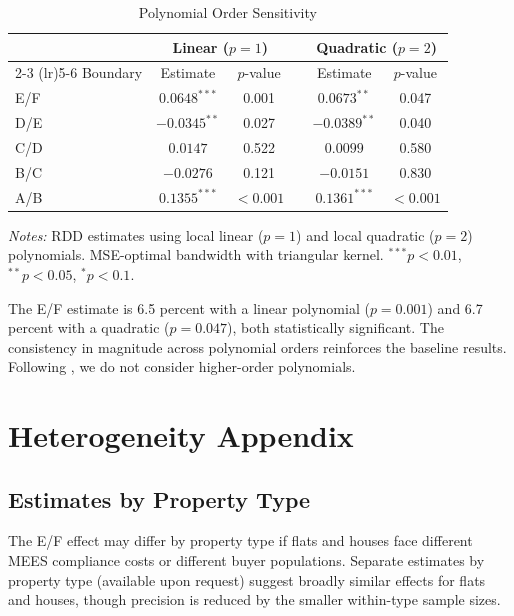 \documentclass[12pt]{article}
\begin{document}
\begin{table}[H]
\centering
\caption{Polynomial Order Sensitivity}
\label{tab:polynomial}
\begin{tabular}{lccccc}
\toprule
 & \multicolumn{2}{c}{Linear ($p=1$)} & & \multicolumn{2}{c}{Quadratic ($p=2$)} \\
\cmidrule(lr){2-3} \cmidrule(lr){5-6}
Boundary & Estimate & $p$-value & & Estimate & $p$-value \\
\midrule
E/F & $0.0648^{***}$ & 0.001 & & $0.0673^{**}$ & 0.047 \\
D/E & $-0.0345^{**}$ & 0.027 & & $-0.0389^{**}$ & 0.040 \\
C/D & $0.0147$ & 0.522 & & $0.0099$ & 0.580 \\
B/C & $-0.0276$ & 0.121 & & $-0.0151$ & 0.830 \\
A/B & $0.1355^{***}$ & $<0.001$ & & $0.1361^{***}$ & $<0.001$ \\
\bottomrule
\end{tabular}
\begin{minipage}{\textwidth}
\footnotesize
\textit{Notes:} RDD estimates using local linear ($p=1$) and local quadratic ($p=2$) polynomials. MSE-optimal bandwidth with triangular kernel. $^{***}p<0.01$, $^{**}p<0.05$, $^{*}p<0.1$.
\end{minipage}
\end{table}

The E/F estimate is 6.5 percent with a linear polynomial ($p = 0.001$) and 6.7 percent with a quadratic ($p = 0.047$), both statistically significant. The consistency in magnitude across polynomial orders reinforces the baseline results. Following \citet{gelman2019why}, we do not consider higher-order polynomials.


\section{Heterogeneity Appendix}\label{app:heterogeneity}

\subsection{Estimates by Property Type}

The E/F effect may differ by property type if flats and houses face different MEES compliance costs or different buyer populations. Separate estimates by property type (available upon request) suggest broadly similar effects for flats and houses, though precision is reduced by the smaller within-type sample sizes.
\end{document}
